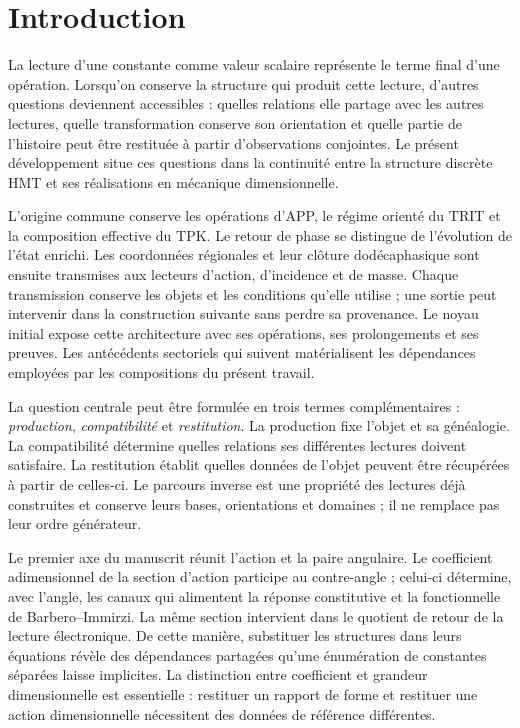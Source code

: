 \section{Introduction}

\label{md:introduccion}
La lecture d’une constante comme valeur scalaire représente le terme final
d’une opération. Lorsqu’on conserve la structure qui produit cette lecture,
d’autres questions deviennent accessibles : quelles relations elle partage avec les autres
lectures, quelle transformation conserve son orientation et quelle partie de
l’histoire peut être restituée à partir d’observations conjointes. Le présent
développement situe ces questions dans la continuité entre la structure discrète
HMT et ses réalisations en mécanique dimensionnelle.

L’origine commune conserve les opérations d’APP, le régime orienté du
TRIT et la composition effective du TPK. Le retour de phase se distingue de
l’évolution de l’état enrichi. Les coordonnées régionales et leur
clôture dodécaphasique sont ensuite transmises aux lecteurs d’action,
d’incidence et de masse. Chaque transmission conserve les objets et les conditions
qu’elle utilise ; une sortie peut intervenir dans la construction suivante sans
perdre sa provenance. Le noyau initial expose cette architecture avec ses
opérations, ses prolongements et ses preuves. Les antécédents sectoriels qui
suivent matérialisent les dépendances employées par les compositions du
présent travail.

La question centrale peut être formulée en trois termes complémentaires :
\emph{production}, \emph{compatibilité} et \emph{restitution}. La
production fixe l’objet et sa généalogie. La compatibilité détermine quelles
relations ses différentes lectures doivent satisfaire. La restitution établit
quelles données de l’objet peuvent être récupérées à partir de celles-ci. Le parcours inverse
est une propriété des lectures déjà construites et conserve leurs bases,
orientations et domaines ; il ne remplace pas leur ordre générateur.

Le premier axe du manuscrit réunit l’action et la paire angulaire. Le
coefficient adimensionnel de la section d’action participe au
contre-angle ; celui-ci détermine, avec l’angle, les canaux qui alimentent la
réponse constitutive et la fonctionnelle de Barbero--Immirzi. La même section
intervient dans le quotient de retour de la lecture électronique. De cette
manière, substituer les structures dans leurs équations révèle des dépendances
partagées qu’une énumération de constantes séparées laisse implicites.
La distinction entre coefficient et grandeur dimensionnelle est essentielle :
restituer un rapport de forme et restituer une action dimensionnelle nécessitent
des données de référence différentes.

